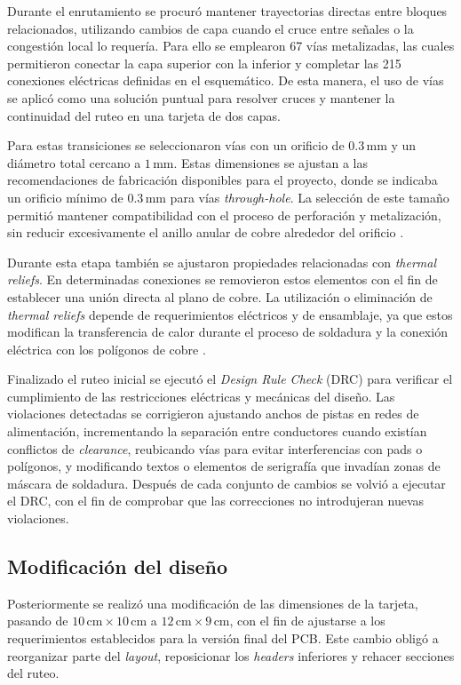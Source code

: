 \documentclass[journal,trans]{IEEEtran}
\begin{document}
Durante el enrutamiento se procuró mantener trayectorias directas entre bloques relacionados, utilizando cambios de capa cuando el cruce entre señales o la congestión local lo requería. Para ello se emplearon 67 vías metalizadas, las cuales permitieron conectar la capa superior con la inferior y completar las 215 conexiones eléctricas definidas en el esquemático. De esta manera, el uso de vías se aplicó como una solución puntual para resolver cruces y mantener la continuidad del ruteo en una tarjeta de dos capas.

Para estas transiciones se seleccionaron vías con un orificio de \(0.3\,\text{mm}\) y un diámetro total cercano a \(1\,\text{mm}\). Estas dimensiones se ajustan a las recomendaciones de fabricación disponibles para el proyecto, donde se indicaba un orificio mínimo de \(0.3\,\text{mm}\) para vías \textit{through-hole}. La selección de este tamaño permitió mantener compatibilidad con el proceso de perforación y metalización, sin reducir excesivamente el anillo anular de cobre alrededor del orificio \cite{ipc2221}.

Durante esta etapa también se ajustaron propiedades relacionadas con \textit{thermal reliefs}. En determinadas conexiones se removieron estos elementos con el fin de establecer una unión directa al plano de cobre. La utilización o eliminación de \textit{thermal reliefs} depende de requerimientos eléctricos y de ensamblaje, ya que estos modifican la transferencia de calor durante el proceso de soldadura y la conexión eléctrica con los polígonos de cobre \cite{ipc2221}.

Finalizado el ruteo inicial se ejecutó el \textit{Design Rule Check} (DRC) para verificar el cumplimiento de las restricciones eléctricas y mecánicas del diseño. Las violaciones detectadas se corrigieron ajustando anchos de pistas en redes de alimentación, incrementando la separación entre conductores cuando existían conflictos de \textit{clearance}, reubicando vías para evitar interferencias con pads o polígonos, y modificando textos o elementos de serigrafía que invadían zonas de máscara de soldadura. Después de cada conjunto de cambios se volvió a ejecutar el DRC, con el fin de comprobar que las correcciones no introdujeran nuevas violaciones.


\subsection{Modificación del diseño}

Posteriormente se realizó una modificación de las dimensiones de la tarjeta, pasando de \(10\,\text{cm} \times 10\,\text{cm}\) a \(12\,\text{cm} \times 9\,\text{cm}\), con el fin de ajustarse a los requerimientos establecidos para la versión final del PCB. Este cambio obligó a reorganizar parte del \textit{layout}, reposicionar los \textit{headers} inferiores y rehacer secciones del ruteo.
\end{document}

